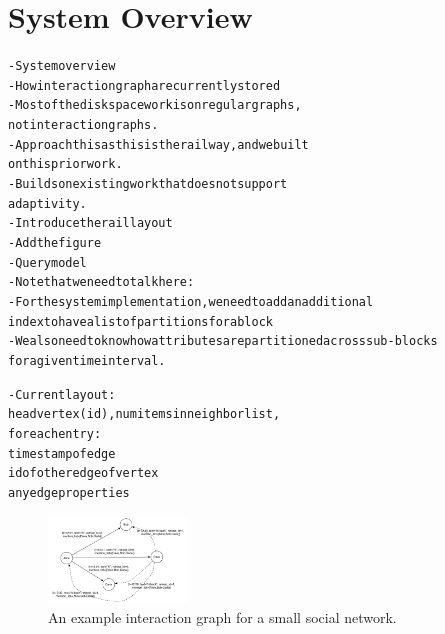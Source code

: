 \section{System Overview}\label{sec:system}
\begin{alltt}\scriptsize
- System overview
    - How interaction graph are currently stored
        - Most of the disk space work is on regular graphs, 
           not interaction graphs. 
        - Approach this as this is the railway, and we built
           on this prior work.
        - Builds on existing work that does not support 
          adaptivity.
    - Introduce the rail layout
    - Add the figure
    - Query model
   - Note that we need to talk here:
    - For the system implementation, we need to add an additional
       index to have a list of partitions for a block
   - We also need to know how attributes are partitioned across sub-blocks 
      for a given time interval.

    - Current layout:
    head vertex (id), num items in neighbor list, 
    for each entry:
        timestamp of edge
        id of other edge of vertex
        any edge properties

\end{alltt}


\begin{figure}[ht!]
\includegraphics[width=0.33\textwidth]{figures/example_interaction.pdf} 
 \caption{An example interaction graph for a small social network.}
 \label{fig:example}
 \end{figure}